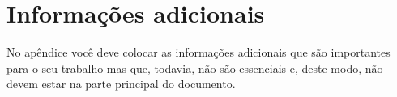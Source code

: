


\chapter{Informações adicionais}

No apêndice você deve colocar as informações adicionais que
são importantes para o seu trabalho mas que, todavia, não são
essenciais e, deste modo, não devem estar na parte principal do documento.
